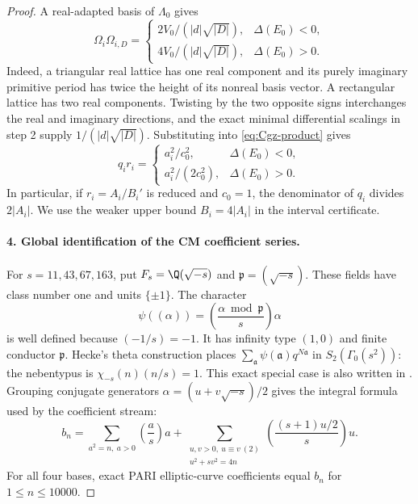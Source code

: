 \begin{proof}
A real-adapted basis of $\Lambda_0$ gives
\[
 \Omega_i\Omega_{i,D}=
 \begin{cases}
 2V_0/(|d|\sqrt{|D|}),&\Delta(E_0)<0,\\
 4V_0/(|d|\sqrt{|D|}),&\Delta(E_0)>0.
 \end{cases}
\]
Indeed, a triangular real lattice has one real component and its
purely imaginary primitive period has twice the height of its
nonreal basis vector. A rectangular lattice has two real
components. Twisting by the two opposite signs interchanges the
real and imaginary directions, and the exact minimal differential
scalings in step 2 supply $1/(|d|\sqrt{|D|})$.
Substituting into \eqref{eq:Cgz-product} gives
\begin{equation}\label{eq:Cgz-denominator}
 q_ir_i=
 \begin{cases}
 a_i^2/c_0^2,&\Delta(E_0)<0,\\
 a_i^2/(2c_0^2),&\Delta(E_0)>0.
 \end{cases}
\end{equation}
In particular, if $r_i=A_i/B_i'$ is reduced and $c_0=1$, the
denominator of $q_i$ divides $2|A_i|$. We use the weaker upper
bound $B_i=4|A_i|$ in the interval certificate.

\paragraph{4. Global identification of the CM coefficient series.}
For $s=11,43,67,163$, put
$F_s=\Q(\sqrt{-s})$ and $\mathfrak p=(\sqrt{-s})$.
These fields have class number one and units $\{\pm1\}$.
The character
\[
 \psi((\alpha))=
  \left(\frac{\alpha\bmod\mathfrak p}{s}\right)\alpha
\]
is well defined because $(-1/s)=-1$. It has infinity type $(1,0)$
and finite conductor $\mathfrak p$. Hecke's theta construction
places $\sum_{\mathfrak a}\psi(\mathfrak a)q^{N\mathfrak a}$ in
$S_2(\Gamma_0(s^2))$: the nebentypus is
$\chi_{-s}(n)(n/s)=1$. This exact special case is also written
in \citet[\S3, pp.~4--5]{CrDarmon2009}. Grouping conjugate
generators $\alpha=(u+v\sqrt{-s})/2$ gives the integral formula
used by the coefficient stream:
\[
 b_n=\sum_{a^2=n,\ a>0}\left(\frac as\right)a
  +\sum_{\substack{u,v>0,\ u\equiv v\ (2)\\u^2+sv^2=4n}}
       \left(\frac{(s+1)u/2}{s}\right)u.
\]
For all four bases, exact PARI elliptic-curve coefficients equal
$b_n$ for $1\leq n\leq10000$.


\end{proof}
